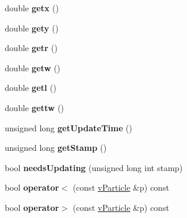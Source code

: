 \begin{DoxyCompactItemize}
\item 
double {\bfseries getx} ()\hypertarget{classvParticle_a3d198bc0a1b1a475ab0b044bbff61488}{}\label{classvParticle_a3d198bc0a1b1a475ab0b044bbff61488}

\item 
double {\bfseries gety} ()\hypertarget{classvParticle_a40050ef035199b05e7cfd2601003d68a}{}\label{classvParticle_a40050ef035199b05e7cfd2601003d68a}

\item 
double {\bfseries getr} ()\hypertarget{classvParticle_ac78d2469a78798f791a5dab9f69b732e}{}\label{classvParticle_ac78d2469a78798f791a5dab9f69b732e}

\item 
double {\bfseries getw} ()\hypertarget{classvParticle_ac75939f4ac46ee086991fb629c583ada}{}\label{classvParticle_ac75939f4ac46ee086991fb629c583ada}

\item 
double {\bfseries getl} ()\hypertarget{classvParticle_a9b43157a0b2b278873c78806ccd75f6f}{}\label{classvParticle_a9b43157a0b2b278873c78806ccd75f6f}

\item 
double {\bfseries gettw} ()\hypertarget{classvParticle_a1760cb3cbd3014e6f5cf0a55e5d4dfff}{}\label{classvParticle_a1760cb3cbd3014e6f5cf0a55e5d4dfff}

\item 
unsigned long {\bfseries get\+Update\+Time} ()\hypertarget{classvParticle_aa866c2138932659daa4b4bf5fb066127}{}\label{classvParticle_aa866c2138932659daa4b4bf5fb066127}

\item 
unsigned long {\bfseries get\+Stamp} ()\hypertarget{classvParticle_af3b6763f2a1934d6f0cd470d3f1ea830}{}\label{classvParticle_af3b6763f2a1934d6f0cd470d3f1ea830}

\item 
bool {\bfseries needs\+Updating} (unsigned long int stamp)\hypertarget{classvParticle_a40088530921a6cdcc80f6ec56f6ff50f}{}\label{classvParticle_a40088530921a6cdcc80f6ec56f6ff50f}

\item 
bool {\bfseries operator$<$} (const \hyperlink{classvParticle}{v\+Particle} \&p) const \hypertarget{classvParticle_a5f1d15db973dbc077ed6f1b30a6fc9bf}{}\label{classvParticle_a5f1d15db973dbc077ed6f1b30a6fc9bf}

\item 
bool {\bfseries operator$>$} (const \hyperlink{classvParticle}{v\+Particle} \&p) const \hypertarget{classvParticle_ab62ea7572f30877c05f917c4f7c04416}{}\label{classvParticle_ab62ea7572f30877c05f917c4f7c04416}

\end{DoxyCompactItemize}



